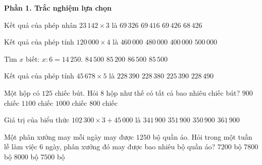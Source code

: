 \textbf{Phần 1. Trắc nghiệm lựa chọn}

\begin{ex} %
Kết quả của phép nhân $23\,142 \times 3$ là
\choice
{$69\,326$}
{$69\,416$}
{\True $69\,426$}
{$68\,426$}
\end{ex}

\begin{ex} %
Kết quả của phép tính $120\,000 \times 4$ là
\choice
{$460\,000$}
{\True $480\,000$}
{$400\,000$}
{$500\,000$}
\end{ex}

\begin{ex} %
Tìm $x$ biết: $x : 6 = 14\,250$.
\choice
{$84\,500$}
{$85\,200$}
{$86\,500$}
{\True $85\,500$}
\end{ex}

\begin{ex} %
Kết quả của phép tính $45\,678 \times 5$ là
\choice
{\True $228\,390$}
{$228\,380$}
{$225\,390$}
{$228\,490$}
\end{ex}

\begin{ex} %
Một hộp có $125$ chiếc bút. Hỏi $8$ hộp như thế có tất cả bao nhiêu chiếc bút?
\choice
{$900$ chiếc}
{$1100$ chiếc}
{\True $1000$ chiếc}
{$800$ chiếc}
\end{ex}

\begin{ex} %
Giá trị của biểu thức $102\,300 \times 3 + 45\,000$ là
\choice
{$341\,900$}
{\True $351\,900$}
{$350\,900$}
{$361\,900$}
\end{ex}

\begin{ex} %
Một phân xưởng may mỗi ngày may được $1250$ bộ quần áo. Hỏi trong một tuần lễ làm việc 6 ngày, phân xưởng đó may được bao nhiêu bộ quần áo?
\choice
{$7200$ bộ}
{$7800$ bộ}
{$8000$ bộ}
{\True $7500$ bộ}
\end{ex}

